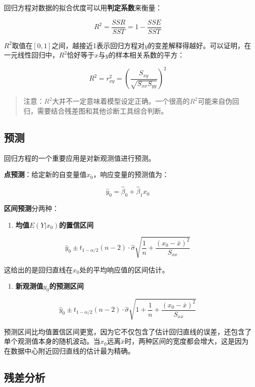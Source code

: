 \documentclass[
]{book}
\providecommand{\tightlist}{%
  \setlength{\itemsep}{0pt}\setlength{\parskip}{0pt}}
\begin{document}
回归方程对数据的拟合优度可以用\textbf{判定系数}来衡量：

\[
R^2 = \frac{SSR}{SST} = 1 - \frac{SSE}{SST}
\]

\(R^2\)取值在\([0, 1]\)之间，越接近1表示回归方程对\(y\)的变差解释得越好。可以证明，在一元线性回归中，\(R^2\)恰好等于\(x\)与\(y\)的样本相关系数的平方：

\[
R^2 = r_{xy}^2 = \left( \frac{S_{xy}}{\sqrt{S_{xx} S_{yy}}} \right)^2
\]

\begin{quote}
注意：\(R^2\)大并不一定意味着模型设定正确。一个很高的\(R^2\)可能来自伪回归，需要结合残差图和其他诊断工具综合判断。
\end{quote}

\subsection{预测}\label{ux9884ux6d4b}

回归方程的一个重要应用是对新观测值进行预测。

\textbf{点预测}：给定新的自变量值\(x_0\)，响应变量的预测值为：

\[
\hat{y}_0 = \hat{\beta}_0 + \hat{\beta}_1 x_0
\]

\textbf{区间预测}分两种：

\begin{enumerate}
\def\labelenumi{\arabic{enumi}.}
\tightlist
\item
  \textbf{均值\(E(Y|x_0)\)的置信区间}
\end{enumerate}

\[
\hat{y}_0 \pm t_{1-\alpha/2}(n-2) \cdot \hat{\sigma} \sqrt{\frac{1}{n} + \frac{(x_0 - \bar{x})^2}{S_{xx}}}
\]

这给出的是回归直线在\(x_0\)处的平均响应值的区间估计。

\begin{enumerate}
\def\labelenumi{\arabic{enumi}.}
\setcounter{enumi}{1}
\tightlist
\item
  \textbf{新观测值\(y_0\)的预测区间}
\end{enumerate}

\[
\hat{y}_0 \pm t_{1-\alpha/2}(n-2) \cdot \hat{\sigma} \sqrt{1 + \frac{1}{n} + \frac{(x_0 - \bar{x})^2}{S_{xx}}}
\]

预测区间比均值置信区间更宽，因为它不仅包含了估计回归直线的误差，还包含了单个观测值本身的随机波动。当\(x_0\)远离\(\bar{x}\)时，两种区间的宽度都会增大，这是因为在数据中心附近回归直线的估计最为精确。

\subsection{残差分析}\label{ux6b8bux5deeux5206ux6790}
\end{document}
